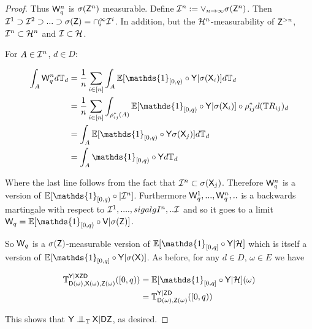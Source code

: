 \begin{proof}
Thus $\mathsf{W}_q^n$ is $\sigma(\mathsf{Z}^n)$ measurable. Define $\mathcal{I}^n:=\vee_{n\to\infty} \sigma(\mathsf{Z}^n)$. Then $\mathcal{I}^1\supset\mathcal{I}^2\supset...\supset\sigma(\mathsf{Z})=\cap_{i}^\infty \mathcal{I}^i$. In addition, but the $\mathcal{H}^n$-measurability of $\mathsf{Z}^{>n}$, $\mathcal{I}^n\subset\mathcal{H}^n$ and $\mathcal{I}\subset\mathcal{H}$.

For $A\in\mathcal{I}^n$, $d\in D$:

\begin{align}
    \int_A \RV{W}_q^n d\kernel{T}_d &= \frac{1}{n}\sum_{i\in[n]} \int_A \mathbb{E}[\mathds{1}_{[0,q)}\circ\RV{Y}|\sigma(\RV{X}_i)] d\kernel{T}_d\\
                                  &= \frac{1}{n}\sum_{i\in[n]} \int_{\rho_{ij}^*(A)} \mathbb{E}[\mathds{1}_{[0,q)}\circ\RV{Y}|\sigma(\RV{X}_i)]\circ\rho_{ij}^*d(\kernel{T}R_{ij})_d\\
                                  &= \int_{A} \mathbb{E}[\mathds{1}_{[0,q)}\circ \RV{Y} \sigma(\RV{X}_j)]d\kernel{T}_d\\
                                  &= \int_{A} \mathds{1}_{[0,q)}\circ \RV{Y} d\kernel{T}_d
\end{align}

Where the last line follows from the fact that $\mathcal{I}^n\subset \sigma(\mathsf{X}_j)$. Therefore $\mathsf{W}^n_q$ is a version of $\mathbb{E}[\mathds{1}_{[0,q)}\circ|\sigalg{I}^n]$. Furthermore $\mathsf{W}^1_q,...,\mathsf{W}^n_q,..$ is a backwards martingale with respect to $\mathcal{I}^1,....,sigalg{I}^n,..\mathcal{I}$ and so it goes to a limit $\RV{W}_q=\mathbb{E}[\mathds{1}_{[0,q)}\circ \RV{V} |\sigma(\RV{Z})]$.

So $\mathsf{W}_q$ is a $\sigma(\mathsf{Z})$-measurable version of $\mathbb{E}[\mathds{1}_{[0,q]}\circ\RV{Y}|\sigalg{H}]$ which is itself a version of $\mathbb{E}[\mathds{1}_{[0,q]}\circ\RV{Y}|\sigma(\RV{X})]$. As before, for any $d\in D$, $\omega\in E$ we have

\begin{align}
    \kernel{T}_{\RV{D}(\omega),\RV{X}(\omega),\RV{Z}(\omega)}^{\RV{Y}|\RV{X}\RV{Z}\RV{D}}([0,q)) &= \mathbb{E}[\mathds{1}_{[0,q]}\circ\RV{Y}|\sigalg{H}](\omega)\\
                                                                                                 &= \kernel{T}_{\RV{D}(\omega),\RV{Z}(\omega)}^{\RV{Y}|\RV{Z}\RV{D}}([0,q))
\end{align}

This shows that $\RV{Y}\CI_{\kernel{T}} \RV{X}|\RV{D}\RV{Z}$, as desired.

\end{proof}

